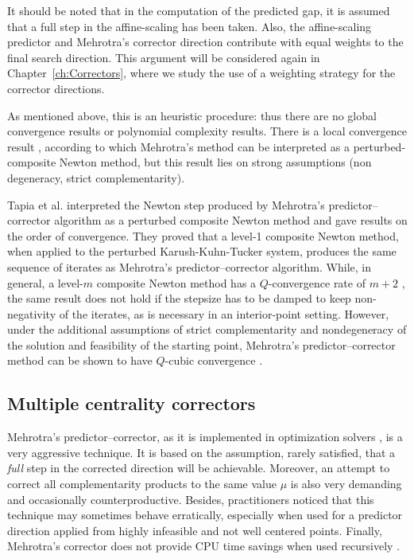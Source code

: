 It should be noted that in the computation of the predicted gap, 
it is assumed that a full step in the affine-scaling has been taken. 
Also, the affine-scaling predictor and Mehrotra's corrector direction 
contribute with equal weights to the final search direction. 
This argument will be considered again in Chapter~\ref{ch:Correctors}, 
where we study the use of a weighting strategy for the corrector
directions.

As mentioned above, this is an heuristic procedure: thus there are 
no global convergence results or polynomial complexity results. 
There is a local convergence result \cite{TapiaZhangSaltzmanWeiser}, 
according to which Mehrotra's method can be interpreted as a 
perturbed-composite Newton method, but this result lies on strong 
assumptions (non degeneracy, strict complementarity).

Tapia et al. \cite{TapiaZhangSaltzmanWeiser} interpreted the Newton step 
produced by Mehrotra's predictor--corrector algorithm as a perturbed
composite Newton method and gave results on the order of convergence. 
They proved that a level-1 composite Newton method, when applied 
to the perturbed Karush-Kuhn-Tucker system, produces the same 
sequence of iterates as Mehrotra's predictor--corrector algorithm. 
While, in general, a level-$m$ composite Newton method has 
a $Q$-convergence rate of $m+2$ \cite{OrtegaRheinboldt},
the same result does not hold 
if the stepsize has to be damped to keep non-negativity of the iterates, 
as is necessary in an interior-point setting. However, under 
the additional assumptions of strict complementarity and nondegeneracy 
of the solution and feasibility of the starting point, Mehrotra's 
predictor--corrector method can be shown to have $Q$-cubic convergence
\cite{TapiaZhangSaltzmanWeiser}.

%
%
\subsection{Multiple centrality correctors}
\label{sec:MultipleCC}

Mehrotra's predictor--corrector, as it is implemented in optimization 
solvers \cite{LustigMarstenShanno,Mehrotra92}, is a very aggressive 
technique. It is based on the assumption, rarely satisfied, that a 
{\it full} step in the corrected direction will be achievable.
Moreover, an attempt to correct all complementarity products to the 
same value $\mu$ is also very demanding and occasionally
counterproductive. 
Besides, practitioners noticed that this technique may sometimes 
behave erratically, especially when used for a predictor direction 
applied from highly infeasible and not well centered points. 
Finally, Mehrotra's corrector does not provide CPU time savings 
when used recursively \cite{CarpenterLustigMulveyShanno}.

